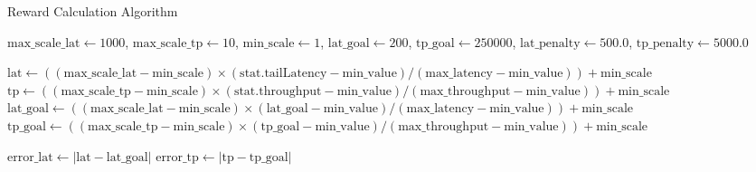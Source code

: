 \label{appendix:a}

\begin{algorithm}[ht]
    \small
    \caption{Reward Calculation Algorithm}
    \label{algo:reward_calculation}
    \SetAlgoLined
    $\text{max\_scale\_lat} \leftarrow 1000$, $\text{max\_scale\_tp} \leftarrow 10$, $\text{min\_scale} \leftarrow 1$, $\text{lat\_goal} \leftarrow 200$, $\text{tp\_goal} \leftarrow 250000$, $\text{lat\_penalty} \leftarrow 500.0$, $\text{tp\_penalty} \leftarrow 5000.0$\;
      
    $\text{lat} \leftarrow ((\text{max\_scale\_lat} - \text{min\_scale}) \times (\text{stat.tailLatency} - \text{min\_value}) / (\text{max\_latency} - \text{min\_value})) + \text{min\_scale}$\;
    $\text{tp} \leftarrow ((\text{max\_scale\_tp} - \text{min\_scale}) \times (\text{stat.throughput} - \text{min\_value}) / (\text{max\_throughput} - \text{min\_value})) + \text{min\_scale}$\;
    $\text{lat\_goal} \leftarrow ((\text{max\_scale\_lat} - \text{min\_scale}) \times (\text{lat\_goal} - \text{min\_value}) / (\text{max\_latency} - \text{min\_value})) + \text{min\_scale}$\;
    $\text{tp\_goal} \leftarrow ((\text{max\_scale\_tp} - \text{min\_scale}) \times (\text{tp\_goal} - \text{min\_value}) / (\text{max\_throughput} - \text{min\_value})) + \text{min\_scale}$\;
      
    $\text{error\_lat} \leftarrow |\text{lat} - \text{lat\_goal}|$\;
    $\text{error\_tp} \leftarrow |\text{tp} - \text{tp\_goal}|$\;
      
  \end{algorithm}

